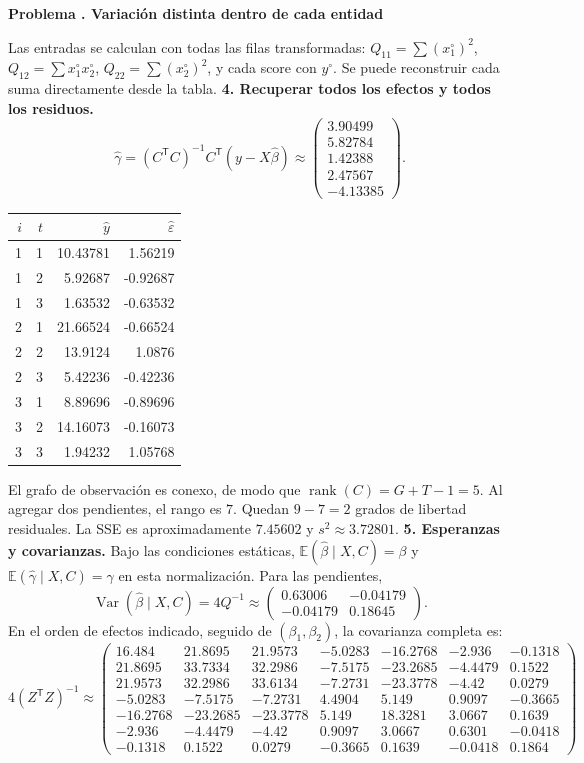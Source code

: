 \documentclass[11pt,a4paper]{article}
\newcommand{\E}{\mathbb E}
\newcommand{\T}{^{\mathsf T}}
\DeclareMathOperator{\Var}{Var}
\DeclareMathOperator{\rank}{rank}
\theoremstyle{definition}
\newcounter{problema}
\newenvironment{resuelto}[1]{\refstepcounter{problema}\par\medskip\Needspace{6\baselineskip}\textbf{Problema \theproblema. #1}\par}{\par\medskip}
\newcommand{\eps}{\varepsilon}
\begin{document}
\begin{resuelto}{Variación distinta dentro de cada entidad}
\[\]
Las entradas se calculan con todas las filas transformadas: $Q_{11}=\sum (x_1^\circ)^2$, $Q_{12}=\sum x_1^\circ x_2^\circ$, $Q_{22}=\sum (x_2^\circ)^2$, y cada score con $y^\circ$. Se puede reconstruir cada suma directamente desde la tabla.
\textbf{4. Recuperar todos los efectos y todos los residuos.}
\[
\widehat\gamma=(C\T C)^{-1}C\T(y-X\widehat\beta)\approx\begin{pmatrix}
3.90499\\5.82784\\1.42388\\2.47567\\-4.13385
\end{pmatrix}.
\]

\begin{center}\small
\begin{tabular}{rrrr}
\toprule
$i$&$t$&$\widehat y$&$\widehat\eps$\\
\midrule
1&1&10.43781&1.56219\\
1&2&5.92687&-0.92687\\
1&3&1.63532&-0.63532\\
2&1&21.66524&-0.66524\\
2&2&13.9124&1.0876\\
2&3&5.42236&-0.42236\\
3&1&8.89696&-0.89696\\
3&2&14.16073&-0.16073\\
3&3&1.94232&1.05768\\
\bottomrule
\end{tabular}
\end{center}
El grafo de observación es conexo, de modo que $\rank(C)=G+T-1=5$. Al agregar dos pendientes, el rango es $7$. Quedan $9-7=2$ grados de libertad residuales. La SSE es aproximadamente $7.45602$ y $s^2\approx3.72801$.
\textbf{5. Esperanzas y covarianzas.} Bajo las condiciones estáticas, $\E(\widehat\beta\mid X,C)=\beta$ y $\E(\widehat\gamma\mid X,C)=\gamma$ en esta normalización. Para las pendientes,
\[
\Var(\widehat\beta\mid X,C)=4Q^{-1}\approx\begin{pmatrix}
0.63006&-0.04179\\-0.04179&0.18645
\end{pmatrix}.
\]
En el orden de efectos indicado, seguido de $(\beta_1,\beta_2)$, la covarianza completa es:
{\small
\[
4(Z\T Z)^{-1}\approx\begin{pmatrix}
16.484&21.8695&21.9573&-5.0283&-16.2768&-2.936&-0.1318\\21.8695&33.7334&32.2986&-7.5175&-23.2685&-4.4479&0.1522\\21.9573&32.2986&33.6134&-7.2731&-23.3778&-4.42&0.0279\\-5.0283&-7.5175&-7.2731&4.4904&5.149&0.9097&-0.3665\\-16.2768&-23.2685&-23.3778&5.149&18.3281&3.0667&0.1639\\-2.936&-4.4479&-4.42&0.9097&3.0667&0.6301&-0.0418\\-0.1318&0.1522&0.0279&-0.3665&0.1639&-0.0418&0.1864

\end{pmatrix}\]}
\end{resuelto}
\end{document}
